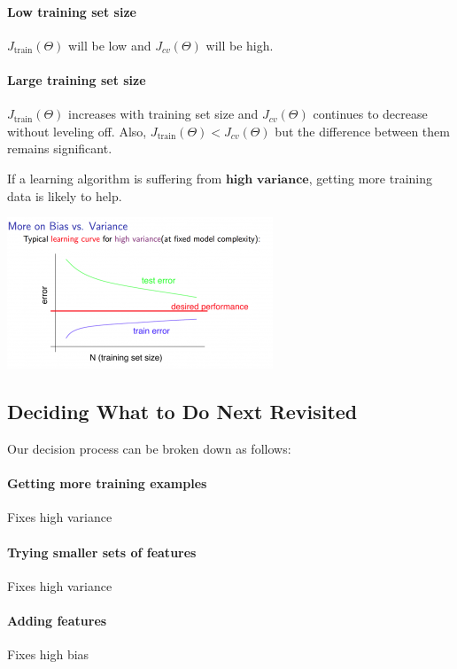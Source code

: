 \documentclass[UTF8]{article}
\begin{document}
\paragraph{Low training set size} $J_\text{train}(\Theta)$ will be low and $J_{cv}(\Theta)$ will be high.
\paragraph{Large training set size} $J_\text{train}(\Theta)$ increases with training set size and $J_{cv}(\Theta)$ continues to decrease without leveling off. Also, $J_\text{train}(\Theta) < J_{cv}(\Theta)$ but the difference between them remains significant.

If a learning algorithm is suffering from $\textbf{high variance}$, getting more training data is likely to help.

\includegraphics[width = \textwidth]{NotePics/10_5_2.png}

\subsection{Deciding What to Do Next Revisited}

Our decision process can be broken down as follows:

\paragraph{Getting more training examples} Fixes high variance
\paragraph{Trying smaller sets of features} Fixes high variance
\paragraph{Adding features} Fixes high bias
\end{document}
